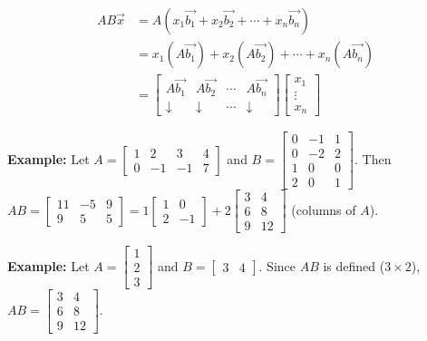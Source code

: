 \documentclass{article}
\begin{document}
\begin{align*}
AB\vec{x} &= A(x_1\vec{b_1} + x_2\vec{b_2} + \cdots + x_n\vec{b_n}) \\
&= x_1(A\vec{b_1}) + x_2(A\vec{b_2}) + \cdots + x_n(A\vec{b_n}) \\
&= \begin{bmatrix} A\vec{b_1} & A\vec{b_2} & \cdots & A\vec{b_n} \\
\downarrow & \downarrow & \cdots & \downarrow \end{bmatrix} 
\begin{bmatrix} x_1 \\ \vdots \\ x_n \end{bmatrix}
\end{align*}

\textbf{Example:} Let $A = \begin{bmatrix} 1 & 2 & 3 & 4 \\ 0 & -1 & -1 & 7 \end{bmatrix}$ and $B = \begin{bmatrix} 0 & -1 & 1 \\ 0 & -2 & 2 \\ 1 & 0 & 0 \\ 2 & 0 & 1 \end{bmatrix}$. Then $AB = \begin{bmatrix} 11 & -5 & 9 \\ 9 & 5 & 5 \end{bmatrix} = 1\begin{bmatrix} 1 & 0 \\ 2 & -1 \end{bmatrix} + 2\begin{bmatrix} 3 & 4 \\ 6 & 8 \\ 9 & 12 \end{bmatrix}$ (columns of $A$).

\textbf{Example:} Let $A = \begin{bmatrix} 1 \\ 2 \\ 3 \end{bmatrix}$ and $B = \begin{bmatrix} 3 & 4 \end{bmatrix}$. Since $AB$ is defined ($3 \times 2$), $AB = \begin{bmatrix} 3 & 4 \\ 6 & 8 \\ 9 & 12 \end{bmatrix}$.
\end{document}
